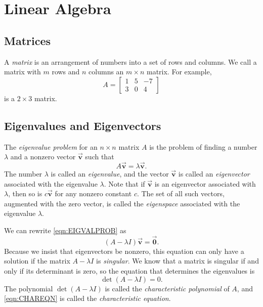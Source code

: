 \documentclass{book}
\newcommand{\BV}{\vec{\textbf{v}}}
\newcommand{\BZ}{\vec{\textbf{0}}}  %
\begin{document}
\chapter{Linear Algebra}
%
\section{Matrices}
A \emph{matrix} is an arrangement of numbers into
a set of rows and columns.  We call a matrix with
$m$ rows and $n$ columns an $m\times n$ matrix.
For example,
\[
   A = \begin{bmatrix}
           1 & 5 & -7 \\ 3 & 0 & 4
       \end{bmatrix}
\]
is a $2\times 3$ matrix.
%
\section{Eigenvalues and Eigenvectors}
%
The \emph{eigenvalue problem}
for an $n \times n$ matrix $A$
is the problem of finding a number $\lambda$ and a nonzero vector $\BV$
such that
\begin{equation}
    A\BV = \lambda \BV.
    \label{eqn:EIGVALPROB}
\end{equation}
The number $\lambda$ is called an \emph{eigenvalue}, 
and the vector $\BV$ is called an \emph{eigenvector}
associated with the eigenvalue $\lambda$.
Note that if $\BV$ is an eigenvector associated with
$\lambda$, then so is $c\BV$ for any nonzero constant
$c$.
The set of all such vectors, augmented with the zero
vector, is called the \emph{eigenspace}
associated with the eigenvalue $\lambda$.

We can rewrite \eqref{eqn:EIGVALPROB} as
\begin{equation}
   \left(A - \lambda I\right) \BV = \BZ.
\end{equation}
Because we insist that eigenvectors be nonzero,
this equation can only have a solution if
the matrix $A-\lambda I$ is \emph{singular}.
We know that a matrix is singular if and only if
its determinant is zero, so the equation that determines
the eigenvalues is
\begin{equation}
   \det\left(A-\lambda I\right) = 0.
   \label{eqn:CHAREQN}
\end{equation}
The polynomial $\det\left(A-\lambda I\right)$ is called
the \emph{characteristic polynomial}
of $A$, and
\eqref{eqn:CHAREQN} is 
called the \emph{characteristic equation}.
\end{document}
